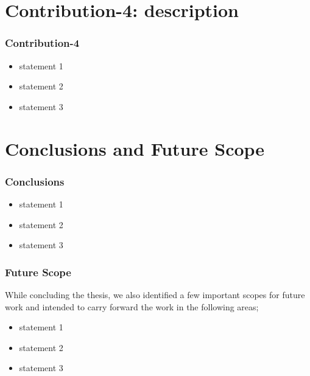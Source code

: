 \documentclass{beamer}
\begin{document}
\section{Contribution-4: description }
\begin{frame} [allowframebreaks]
\frametitle{Contribution-4}

\begin{itemize}
    \item statement 1
    \item statement 2
    \item statement 3
\end{itemize}


\end{frame}



\section{Conclusions and Future Scope}
\begin{frame}[allowframebreaks]
\frametitle{Conclusions}
\begin{itemize}
    \item statement 1
    \item statement 2
    \item statement 3
\end{itemize}
\end{frame}



\begin{frame}[allowframebreaks]
\frametitle{Future Scope}
While concluding the thesis, we also identified a few important scopes for future work and intended to carry forward the work in the following areas;
\begin{itemize}
    \item statement 1
    \item statement 2
    \item statement 3
\end{itemize}
 
\end{frame}
\end{document}
